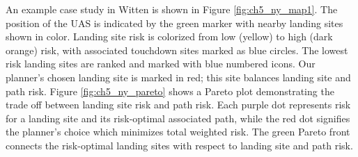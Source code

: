 An example case study in Witten is shown in Figure \ref{fig:ch5_ny_map1}. The position of the UAS is indicated by the green marker with nearby landing sites shown in color. Landing site risk is colorized from low (yellow) to high (dark orange) risk, with associated touchdown sites marked as blue circles. The lowest risk landing sites are ranked and marked with blue numbered icons. Our planner's chosen landing site is marked in red; this site balances landing site and path risk. Figure \ref{fig:ch5_ny_pareto} shows a Pareto plot demonstrating the trade off between landing site risk and path risk. Each purple dot represents risk for a landing site and its risk-optimal associated path, while the red dot signifies the planner's choice which minimizes total weighted risk. The green Pareto front connects the risk-optimal landing sites with respect to landing site and path risk.

